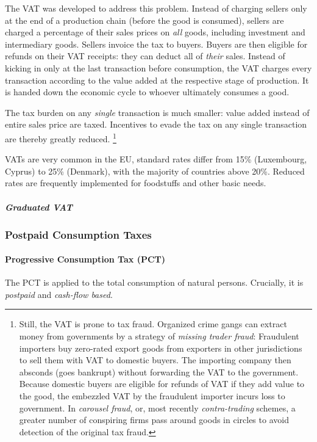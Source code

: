 The VAT was developed to address this problem.
Instead of charging sellers only at the end of a production chain (before the good is consumed), sellers are charged a percentage of their sales prices on \emph{all} goods, including investment and intermediary goods.
Sellers invoice the tax to buyers.
Buyers are then eligible for refunds on their VAT receipts:
they can deduct all of \emph{their} sales.
Instead of kicking in only at the last transaction before consumption, the VAT charges every transaction according to the value added at the respective stage of production.
It is handed down the economic cycle to whoever ultimately consumes a good.

The tax burden on any \emph{single} transaction is much smaller:
value added instead of entire sales price are taxed.
Incentives to evade the tax on any single transaction are thereby greatly reduced.
\footnote{
	Still, the VAT is prone to tax fraud.
	Organized crime gangs can extract money from governments by a strategy of \emph{missing trader fraud}:
	Fraudulent importers buy zero-rated export goods from exporters in other jurisdictions to sell them with VAT to domestic buyers.
	The importing company then absconds (goes bankrupt) without forwarding the VAT to the government.
	Because domestic buyers are eligible for refunds of VAT if they add value to the good, the embezzled VAT by the fraudulent importer incurs loss to government.
	In \emph{carousel fraud}, or, most recently \emph{contra-trading} schemes, a greater number of conspiring firms pass around goods in circles to avoid detection of the original tax fraud.
}

VATs are very common in the EU, standard rates differ from 15\% (Luxembourg, Cyprus) to 25\% (Denmark), with the majority of countries above 20\%.
Reduced rates are frequently implemented for foodstuffs and other basic needs.

\subparagraph{Graduated VAT}

\subsubsection{Postpaid Consumption Taxes}

\paragraph{Progressive Consumption Tax (PCT)}
	\label{sec:PCT}
 The \gls{PCT} is applied to the total consumption of natural persons.
Crucially, it is \emph{postpaid} and \emph{cash-flow based}.

